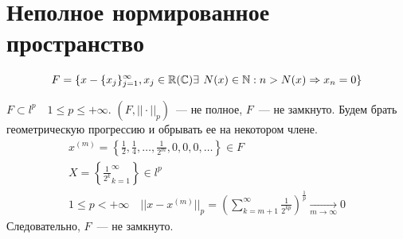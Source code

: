 \documentclass[document]{subfiles}
\begin{document}
    \section{Неполное нормированное пространство}
    \begin{definition}
        \[F = \{ x - \{x_j\}_{j=1}^\infty, x_j \in \bR (\bC) \exists \, N(x) \in \bN : n > N(x) \Rightarrow x_n = 0 \} \]
    \end{definition}
$F \subset l^p \quad 1 \leq p \leq + \infty$.
$(F, || \cdot ||_p) $~--- не полное, $F$~--- не замкнуто.
Будем брать геометрическую прогрессию и обрывать ее на некотором члене.
\begin{gather*}
    x^{(m)} = \left\{ \frac{1}{2}, \frac{1}{4}, \ldots, \frac{1}{2^m}, 0, 0, 0, \ldots \right\} \in F \\
    X = \left\{ \frac{1}{2^k}^\infty_{k=1} \right\} \in l^p \\
    1 \leq p < + \infty \quad ||x - x^{(m)}||_p = \left( \sum^\infty_{k=m+1} \frac{1}{2^{kp}} \right)^{\frac{1}{p}} \underset{m \to \infty}{\longrightarrow} 0
\end{gather*}
Следовательно, $F$~--- не замкнуто.
\end{document}
